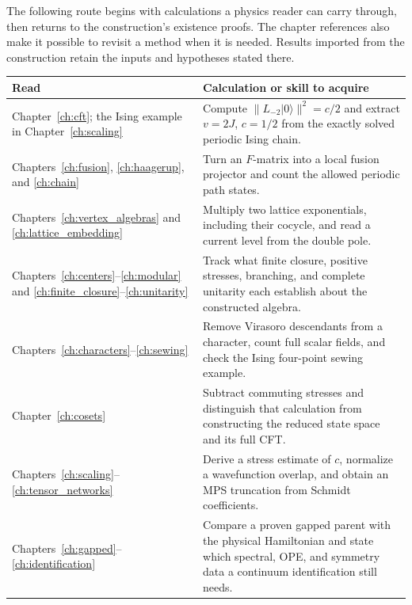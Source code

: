 The following route begins with calculations a physics reader can
carry through, then returns to the construction's existence proofs.
The chapter references also make it possible to revisit a method when
it is needed. Results imported from the construction retain the
inputs and hypotheses stated there.

\begin{center}
\small
\renewcommand{\arraystretch}{1.18}
\begin{tabularx}{\textwidth}{@{}p{}X@{}}
\toprule
Read & Calculation or skill to acquire\\
\midrule
Chapter~\ref{ch:cft}; the Ising example in
Chapter~\ref{ch:scaling}
&
Compute $\|L_{-2}|0\rangle\|^2=c/2$ and extract $v=2J$,
$c=1/2$ from the exactly solved periodic Ising chain.
\\[3pt]
Chapters~\ref{ch:fusion}, \ref{ch:haagerup},
and \ref{ch:chain}
&
Turn an $F$-matrix into a local fusion projector and count
the allowed periodic path states.
\\[3pt]
Chapters~\ref{ch:vertex_algebras} and
\ref{ch:lattice_embedding}
&
Multiply two lattice exponentials, including their cocycle,
and read a current level from the double pole.
\\[3pt]
Chapters~\ref{ch:centers}--\ref{ch:modular} and
\ref{ch:finite_closure}--\ref{ch:unitarity}
&
Track what finite closure, positive stresses, branching,
and complete unitarity each establish about the constructed algebra.
\\[3pt]
Chapters~\ref{ch:characters}--\ref{ch:sewing}
&
Remove Virasoro descendants from a character, count full scalar
fields, and check the Ising four-point sewing example.
\\[3pt]
Chapter~\ref{ch:cosets}
&
Subtract commuting stresses and distinguish that calculation
from constructing the reduced state space and its full CFT.
\\[3pt]
Chapters~\ref{ch:scaling}--\ref{ch:tensor_networks}
&
Derive a stress estimate of $c$, normalize a wavefunction
overlap, and obtain an MPS truncation from Schmidt coefficients.
\\[3pt]
Chapters~\ref{ch:gapped}--\ref{ch:identification}
&
Compare a proven gapped parent with the physical Hamiltonian
and state which spectral, OPE, and symmetry data a continuum
identification still needs.
\\
\bottomrule
\end{tabularx}
\end{center}

